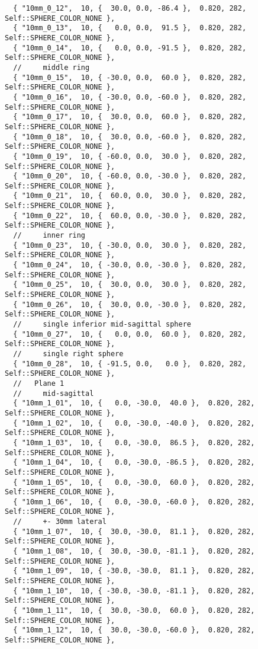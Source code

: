\documentclass{InsightArticle}
\begin{document}
{\begin{verbatim}
  { "10mm_0_12",  10, {  30.0, 0.0, -86.4 },  0.820, 282, Self::SPHERE_COLOR_NONE },
  { "10mm_0_13",  10, {   0.0, 0.0,  91.5 },  0.820, 282, Self::SPHERE_COLOR_NONE },
  { "10mm_0_14",  10, {   0.0, 0.0, -91.5 },  0.820, 282, Self::SPHERE_COLOR_NONE },
  //     middle ring
  { "10mm_0_15",  10, { -30.0, 0.0,  60.0 },  0.820, 282, Self::SPHERE_COLOR_NONE },
  { "10mm_0_16",  10, { -30.0, 0.0, -60.0 },  0.820, 282, Self::SPHERE_COLOR_NONE },
  { "10mm_0_17",  10, {  30.0, 0.0,  60.0 },  0.820, 282, Self::SPHERE_COLOR_NONE },
  { "10mm_0_18",  10, {  30.0, 0.0, -60.0 },  0.820, 282, Self::SPHERE_COLOR_NONE },
  { "10mm_0_19",  10, { -60.0, 0.0,  30.0 },  0.820, 282, Self::SPHERE_COLOR_NONE },
  { "10mm_0_20",  10, { -60.0, 0.0, -30.0 },  0.820, 282, Self::SPHERE_COLOR_NONE },
  { "10mm_0_21",  10, {  60.0, 0.0,  30.0 },  0.820, 282, Self::SPHERE_COLOR_NONE },
  { "10mm_0_22",  10, {  60.0, 0.0, -30.0 },  0.820, 282, Self::SPHERE_COLOR_NONE },
  //     inner ring
  { "10mm_0_23",  10, { -30.0, 0.0,  30.0 },  0.820, 282, Self::SPHERE_COLOR_NONE },
  { "10mm_0_24",  10, { -30.0, 0.0, -30.0 },  0.820, 282, Self::SPHERE_COLOR_NONE },
  { "10mm_0_25",  10, {  30.0, 0.0,  30.0 },  0.820, 282, Self::SPHERE_COLOR_NONE },
  { "10mm_0_26",  10, {  30.0, 0.0, -30.0 },  0.820, 282, Self::SPHERE_COLOR_NONE },
  //     single inferior mid-sagittal sphere
  { "10mm_0_27",  10, {   0.0, 0.0,  60.0 },  0.820, 282, Self::SPHERE_COLOR_NONE },
  //     single right sphere
  { "10mm_0_28",  10, { -91.5, 0.0,   0.0 },  0.820, 282, Self::SPHERE_COLOR_NONE },
  //   Plane 1
  //     mid-sagittal
  { "10mm_1_01",  10, {   0.0, -30.0,  40.0 },  0.820, 282, Self::SPHERE_COLOR_NONE },
  { "10mm_1_02",  10, {   0.0, -30.0, -40.0 },  0.820, 282, Self::SPHERE_COLOR_NONE },
  { "10mm_1_03",  10, {   0.0, -30.0,  86.5 },  0.820, 282, Self::SPHERE_COLOR_NONE },
  { "10mm_1_04",  10, {   0.0, -30.0, -86.5 },  0.820, 282, Self::SPHERE_COLOR_NONE },
  { "10mm_1_05",  10, {   0.0, -30.0,  60.0 },  0.820, 282, Self::SPHERE_COLOR_NONE },
  { "10mm_1_06",  10, {   0.0, -30.0, -60.0 },  0.820, 282, Self::SPHERE_COLOR_NONE },
  //     +- 30mm lateral
  { "10mm_1_07",  10, {  30.0, -30.0,  81.1 },  0.820, 282, Self::SPHERE_COLOR_NONE },
  { "10mm_1_08",  10, {  30.0, -30.0, -81.1 },  0.820, 282, Self::SPHERE_COLOR_NONE },
  { "10mm_1_09",  10, { -30.0, -30.0,  81.1 },  0.820, 282, Self::SPHERE_COLOR_NONE },
  { "10mm_1_10",  10, { -30.0, -30.0, -81.1 },  0.820, 282, Self::SPHERE_COLOR_NONE },
  { "10mm_1_11",  10, {  30.0, -30.0,  60.0 },  0.820, 282, Self::SPHERE_COLOR_NONE },
  { "10mm_1_12",  10, {  30.0, -30.0, -60.0 },  0.820, 282, Self::SPHERE_COLOR_NONE },

\end{verbatim}}
\end{document}
